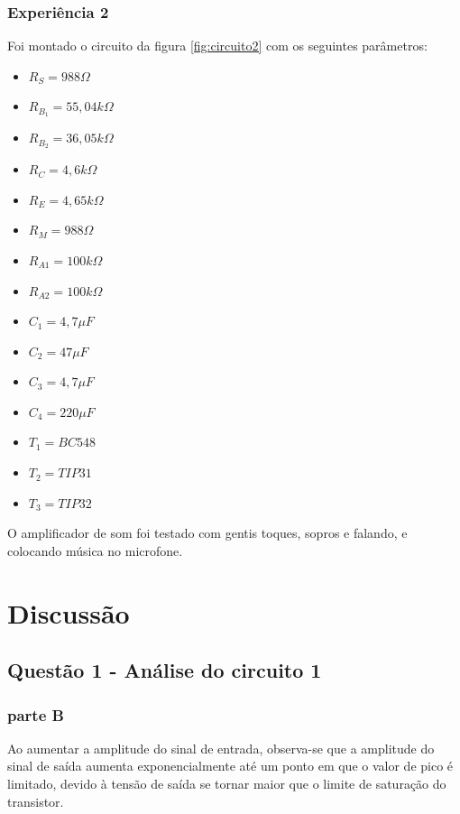 \documentclass{abntex2}
\begin{document}
  \clearpage

\subsection{Experiência 2}

Foi montado o circuito da figura \ref{fig:circuito2} com os seguintes parâmetros:
\begin{itemize}
  \item $R_S = 988\Omega $
  \item $R_B_1 = 55,04k\Omega $
  \item $R_B_2 = 36,05k\Omega $
  \item $R_C = 4,6k\Omega$
  \item $R_E = 4,65k\Omega$
  \item $R_M = 988\Omega$
  \item $R_{A1} = 100k\Omega$
  \item $R_{A2} = 100k\Omega$
  \item $C_1 = 4,7 \mu F$
  \item $C_2 = 47 \mu F$
  \item $C_3 = 4,7 \mu F$
  \item $C_4 = 220 \mu F$
  \item $T_1 = BC548$
  \item $T_2 = TIP31$
  \item $T_3 = TIP32$
\end{itemize}

O amplificador de som foi testado com gentis toques, sopros e falando, e colocando música no microfone.

\chapter{Discussão}

\section{Questão 1 - Análise do circuito 1}

\subsection{parte B}

Ao aumentar a amplitude do sinal de entrada, observa-se que a amplitude do sinal de saída aumenta exponencialmente até um ponto em que o valor de pico é limitado, devido à tensão de saída se tornar maior que o limite de saturação do transistor.
\end{document}
